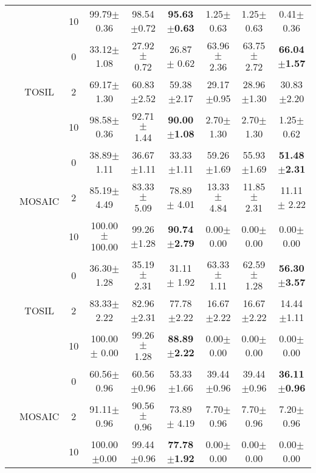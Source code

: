 \begin{table}[t]
{\begin{tabular}{|c|c|c|c|c|c|c|c|c|}
    \cline{3-9}
     &  & 10 & 99.79$\pm$0.36 & 98.54$\pm$0.72 & \textbf{95.63$\pm$0.63} & 1.25$\pm$0.63 & 1.25$\pm$0.63 & 0.41$\pm$0.36 \\ 
    \cline{2-9}
     & \multirow{3}{*}{TOSIL} & 0 & 33.12$\pm$1.08 & 27.92$\pm$
      0.72 & 26.87$\pm$
      0.62 & 63.96$\pm$
      2.36 & 63.75$\pm$
      2.72 & \textbf{66.04$\pm$1.57} \\ 
    \cline{3-9}
     & & 2 & 69.17$\pm$1.30 & 60.83$\pm$2.52 & 59.38$\pm$2.17 & 29.17$\pm$0.95 & 28.96$\pm$1.30 & 30.83$\pm$2.20 \\ 
    \cline{3-9}
     &  & 10 & 98.58$\pm$0.36 & 92.71$\pm$
      1.44 & \textbf{90.00$\pm$1.08} & 2.70$\pm$
      1.30 & 2.70$\pm$
      1.30 & 1.25$\pm$
      0.62 \\ 
    \hhline{|=========|}
    \multirow{6}{*}{\rotatebox[origin=c]{90}{Nut-Assembly}} & \multirow{3}{*}{MOSAIC} & 0 & 38.89$\pm$1.11 & 36.67$\pm$1.11 & 33.33$\pm$1.11 & 59.26$\pm$1.69 & 55.93$\pm$1.69 & \textbf{51.48$\pm$2.31} \\ 
    \cline{3-9}
     & & 2 & 85.19$\pm$
      4.49 & 83.33$\pm$
      5.09 & 78.89$\pm$
      4.01 & 13.33$\pm$
      4.84 & 11.85$\pm$
      2.31 & 11.11$\pm$
      2.22 \\ 
    \cline{3-9}
     &  & 10 & 100.00$\pm$100.00 & 99.26$\pm$1.28 & \textbf{90.74$\pm$2.79} & 0.00$\pm$0.00 & 0.00$\pm$0.00 & 0.00$\pm$0.00 \\ 
    \cline{2-9}
     & \multirow{3}{*}{TOSIL} & 0 & 36.30$\pm$
      1.28 & 35.19$\pm$
      2.31 & 31.11$\pm$
      1.92 & 63.33$\pm$
      1.11 & 62.59$\pm$
      1.28 & \textbf{56.30$\pm$3.57} \\ 
    \cline{3-9}
     & & 2 & 83.33$\pm$2.22 & 82.96$\pm$2.31 & 77.78$\pm$2.22 & 16.67$\pm$2.22 & 16.67$\pm$2.22 & 14.44$\pm$1.11 \\ 
    \cline{3-9}
     &  & 10 & 100.00$\pm$
      0.00 & 99.26$\pm$
      1.28 & \textbf{88.89$\pm$2.22} & 0.00$\pm$
      0.00 & 0.00$\pm$
      0.00 & 0.00$\pm$
      0.00 \\ 
    \hhline{|=========|}
    \multirow{6}{*}{\rotatebox[origin=c]{90}{Stack-Block}} & \multirow{3}{*}{MOSAIC} & 0 & 60.56$\pm$0.96 & 60.56$\pm$0.96 & 53.33$\pm$1.66 & 39.44$\pm$0.96 & 39.44$\pm$0.96 & \textbf{36.11$\pm$0.96} \\ 
    \cline{3-9}
     & & 2 & 91.11$\pm$
      0.96 & 90.56$\pm$
      0.96 & 73.89$\pm$
      4.19 & 7.70$\pm$
      0.96 & 7.70$\pm$
      0.96 & 7.20$\pm$
      0.96 \\ 
    \cline{3-9}
     &  & 10 & 100.00$\pm$0.00 & 99.44$\pm$0.96 & \textbf{77.78$\pm$1.92} & 0.00$\pm$0.00 & 0.00$\pm$0.00 & 0.00$\pm$0.00 \\ 

\end{tabular}}
\end{table}
